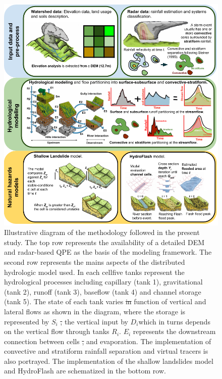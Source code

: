 \documentclass[hess, manuscript]{copernicus}
\providecommand{\DIFadd}[1]{{\protect\color{blue}\uwave{#1}}} %
\providecommand{\DIFdel}[1]{{\protect\color{red}\sout{#1}}}                      %
\providecommand{\DIFaddFL}[1]{\DIFadd{#1}} %
\providecommand{\DIFdelFL}[1]{\DIFdel{#1}} %
\providecommand{\DIFaddbeginFL}{} %
\providecommand{\DIFaddendFL}{} %
\providecommand{\DIFdelbeginFL}{} %
\providecommand{\DIFdelendFL}{} %
\begin{document}
\begin{figure}[t]
\centering
 \includegraphics[width=12cm]{Figures/Salgar_Esquema_v2.png}
 \caption{Illustrative diagram of the methodology followed in the present study. The top row represents the availability of a detailed DEM and  radar-based QPE as the basis of the modeling framework. The second row represents the mains aspects of the distributed hydrologic model used. In each cell\DIFaddbeginFL \DIFaddFL{, }\DIFaddendFL five tanks represent the hydrological processes including capillary (tank 1), gravitational (tank 2), runoff (tank 3), baseflow (tank 4) and channel storage (tank 5). The state of each tank varies \DIFdelbeginFL \DIFdelFL{in }\DIFdelendFL \DIFaddbeginFL \DIFaddFL{as a }\DIFaddendFL function of vertical and lateral flows as shown in the diagram, where the storage is represented by $S_i$ \DIFdelbeginFL \DIFdelFL{, }\DIFdelendFL \DIFaddbeginFL \DIFaddFL{and }\DIFaddendFL the vertical input by $D_i$\DIFaddbeginFL \DIFaddFL{, }\DIFaddendFL which in turns depends on the vertical flow through tanks $R_i$. $E_i$ represents the downstream connection between cells \DIFdelbeginFL \DIFdelFL{, }\DIFdelendFL and evaporation. The implementation of convective and stratiform rainfall separation and virtual tracers is also portrayed. The implementation of the shallow landslides model and HydroFlash are schematized in the bottom row.}
    \label{fig:EsquemaMetodologico}
\end{figure}
\end{document}
